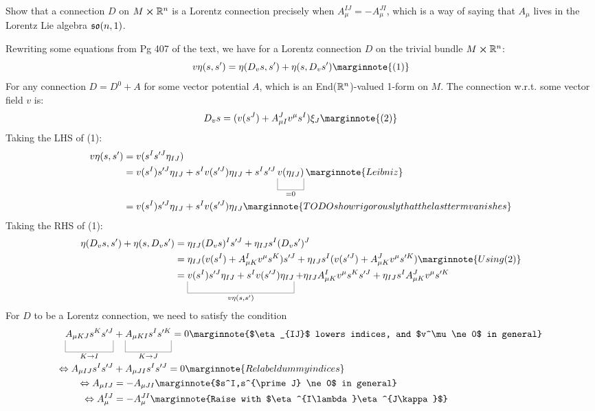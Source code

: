 \documentclass[10pt]{article}
\begin{document}
\begin{example}\label{b3e33}
	Show that a connection $D$ on $M\cross \mathbb{R}^n$ is a Lorentz connection precisely when $A_\mu^{IJ}=-A_\mu^{JI}$, which is a way of saying that $A_\mu$ lives in the Lorentz Lie algebra $\mathfrak{so}(n,1)$.
\end{example}
\sol Rewriting some equations from Pg 407 of the text, we have for a Lorentz connection $D$ on the trivial bundle $M \cross \mathbb{R}^n$:
$$
	v\eta(s,s^\prime) = \eta(D_vs, s^\prime) + \eta(s, D_vs^\prime)\marginnote{(1)}
$$
For any connection $D=D^0+A$ for some vector potential $A$, which is an End($\mathbb{R}^n$)-valued 1-form on $M$. The connection w.r.t. some vector field $v$ is:
$$
	D_vs = (v(s^J) + A_{\mu I}^Jv^\mu s^I)\xi_J\marginnote{(2)}
$$
Taking the LHS of (1):
$$
\begin{aligned}
	v\eta(s,s^\prime) &= v(s^I s^{\prime J} \eta_{IJ})\\
	&= v(s^I) s^{\prime J} \eta_{IJ} + s^I v(s^{\prime J}) \eta_{IJ} + s^I s^{\prime J} \ub{v(\eta_{IJ})}{=0}\marginnote{Leibniz}\\
	&= v(s^I) s^{\prime J} \eta_{IJ} + s^I v(s^{\prime J}) \eta_{IJ}\marginnote{TODO show rigorously that the last term vanishes}\\
\end{aligned}
$$
Taking the RHS of (1):
$$
\begin{aligned}
	\eta(D_vs, s^\prime) + \eta(s, D_vs^\prime) &= \eta_{IJ}(D_vs)^Is^{\prime J} + \eta_{IJ}s^I(D_vs^\prime)^J\\
	&= \eta_{IJ}(v(s^I) + A_{\mu K}^Iv^\mu s^K)s^{\prime J} + \eta_{IJ}s^I(v(s^{\prime J}) + A_{\mu K}^Jv^\mu s^{\prime K})\marginnote{Using (2)}\\
	&= \ub{v(s^I) s^{\prime J} \eta_{IJ} + s^I v(s^{\prime J}) \eta_{IJ}}{v\eta(s,s^\prime)} + \eta_{IJ}A_{\mu K}^Iv^\mu s^Ks^{\prime J} + \eta_{IJ}s^IA_{\mu K}^Jv^\mu s^{\prime K}
\end{aligned}
$$
For $D$ to be a Lorentz connection, we need to satisfy the condition
$$
\begin{aligned}
	\ub{A_{\mu KJ} s^Ks^{\prime J}}{K \to I} &+ \ub{A_{\mu KI}s^I s^{\prime K}}{K \to J} = 0\marginnote{$\eta_{IJ}$ lowers indices, and $v^\mu \ne 0$ in general}\\
	\Leftrightarrow A_{\mu IJ} s^Is^{\prime J} &+ A_{\mu JI}s^I s^{\prime J} = 0\marginnote{Relabel dummy indices}\\
	\Leftrightarrow A_{\mu IJ} &=- A_{\mu JI}\marginnote{$s^I,s^{\prime J} \ne 0$ in general}\\
	\Leftrightarrow A_\mu^{IJ} &=- A_\mu^{JI}\marginnote{Raise with $\eta^{I\lambda}\eta^{J\kappa}$}\\
\end{aligned}
$$
\end{document}
